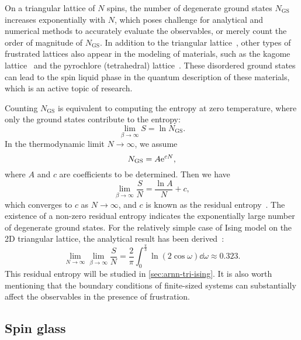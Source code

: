 On a triangular lattice of $N$ spins, the number of degenerate ground states $N_\text{GS}$ increases exponentially with $N$, which poses challenge for analytical and numerical methods to accurately evaluate the observables, or merely count the order of magnitude of $N_\text{GS}$. In addition to the triangular lattice~\cite{liu2020intrinsic}, other types of frustrated lattices also appear in the modeling of materials, such as the kagome lattice~\cite{wolf1988ising} and the pyrochlore (tetrahedral) lattice~\cite{siddharthan1999ising}. These disordered ground states can lead to the spin liquid phase in the quantum description of these materials, which is an active topic of research.

Counting $N_\text{GS}$ is equivalent to computing the entropy at zero temperature, where only the ground states contribute to the entropy:
\begin{equation}
\lim_{\beta \to \infty} S = \ln N_\text{GS}.
\end{equation}
In the thermodynamic limit $N \to \infty$, we assume
\begin{equation}
N_\text{GS} = A \mathrm{e}^{c N},
\end{equation}
where $A$ and $c$ are coefficients to be determined. Then we have
\begin{equation}
\lim_{\beta \to \infty} \frac{S}{N} = \frac{\ln A}{N} + c,
\end{equation}
which converges to $c$ as $N \to \infty$, and $c$ is known as the residual entropy~\cite{mambrini1999residual, vanderstraeten2018residual}. The existence of a non-zero residual entropy indicates the exponentially large number of degenerate ground states. For the relatively simple case of Ising model on the 2D triangular lattice, the analytical result has been derived~\cite{wannier1950antiferromagnetism, wannier1973antiferromagnetism, houtappel1950order}:
\begin{equation}
\lim_{N \to \infty} \lim_{\beta \to \infty} \frac{S}{N} = \frac{2}{\pi} \int_0^{\frac{\pi}{3}} \ln(2 \cos \omega) \dd \omega \approx 0.323.
\end{equation}
This residual entropy will be studied in \cref{sec:arnn-tri-ising}. It is also worth mentioning that the boundary conditions of finite-sized systems can substantially affect the observables in the presence of frustration.

\subsection{Spin glass}
\label{sec:random-interactions}
\label{sec:ea}
\label{sec:sk}

